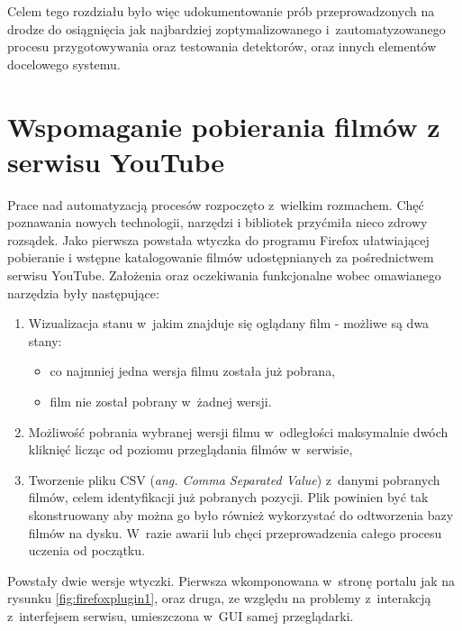 Celem tego rozdziału było więc udokumentowanie prób przeprowadzonych
na drodze do osiągnięcia jak najbardziej zoptymalizowanego 
i~zautomatyzowanego procesu przygotowywania oraz testowania detektorów,
oraz innych elementów docelowego systemu.

\section{Wspomaganie pobierania filmów z serwisu YouTube}

Prace nad automatyzacją procesów rozpoczęto z~wielkim rozmachem.
Chęć poznawania nowych technologii, narzędzi i bibliotek
przyćmiła nieco zdrowy rozsądek. Jako pierwsza powstała wtyczka
do programu Firefox ułatwiającej pobieranie i wstępne katalogowanie filmów
udostępnianych za pośrednictwem serwisu YouTube.
Założenia oraz oczekiwania funkcjonalne wobec omawianego narzędzia były 
następujące:

\begin{enumerate}
    \item Wizualizacja stanu w~jakim znajduje się oglądany film - 
        możliwe są dwa stany:
    \begin{itemize}
        \item co najmniej jedna wersja filmu została już pobrana,
        \item film nie został pobrany w~żadnej wersji.
    \end{itemize}
    \item Możliwość pobrania wybranej wersji filmu w~odległości maksymalnie
        dwóch kliknięć licząc od poziomu przeglądania filmów w~serwisie,
    \item Tworzenie pliku CSV (\textit{ang. Comma Separated Value})
        z~danymi pobranych filmów, celem identyfikacji już pobranych
        pozycji. Plik powinien być tak skonstruowany aby można go było
        również wykorzystać do odtworzenia bazy filmów na dysku. W~razie
        awarii lub chęci przeprowadzenia całego procesu uczenia od
        początku.
\end{enumerate}

Powstały dwie wersje wtyczki. Pierwsza wkomponowana w~stronę portalu
jak na rysunku \ref{fig:firefoxplugin1}, oraz druga, 
ze względu na problemy 
z~interakcją z~interfejsem serwisu, umieszczona w~GUI samej przeglądarki.

